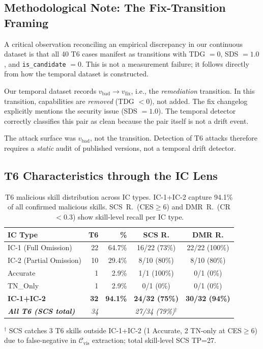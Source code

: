 \subsection{Methodological Note: The Fix-Transition Framing}

A critical observation reconciling an empirical discrepancy in our continuous dataset is that all 40 T6 cases manifest as transitions with TDG $= 0$, SDS $= 1.0$, and \texttt{is\_candidate} $= 0$. This is not a measurement failure; it follows directly from how the temporal dataset is constructed.

Our temporal dataset records $v_{\text{bad}} \to v_{\text{fix}}$,
i.e., the \emph{remediation} transition.
In this transition, capabilities are \emph{removed} (TDG $< 0$),
not added.
The fix changelog explicitly mentions the security issue (SDS $= 1.0$).
The temporal detector correctly classifies this pair as clean
because the pair itself is not a drift event.

The attack surface was $v_{\text{bad}}$, not the transition.
Detection of T6 attacks therefore requires a \emph{static} audit of
published versions, not a temporal drift detector.

\subsection{T6 Characteristics through the IC Lens}

\begin{table}[h]
\centering
\caption{T6 malicious skill distribution across IC types.
  IC-1+IC-2 capture 94.1\% of all confirmed malicious skills.
  SCS~R.~(CES$\geq$6) and DMR~R.~(CR$<$0.3) show skill-level recall per IC type.}
\label{tab:t6_ic_dist}
\scriptsize
\begin{tabular}{@{}lrrcc@{}}
\toprule
\textbf{IC Type} & \textbf{T6} & \textbf{\%} & \textbf{SCS R.} & \textbf{DMR R.} \\
\midrule
IC-1 (Full Omission)    & 22 & 64.7\% & 16/22 (73\%) & 22/22 (100\%) \\
IC-2 (Partial Omission) & 10 & 29.4\% &  8/10 (80\%) &  8/10 (80\%)  \\
Accurate                &  1 &  2.9\% &  1/1  (100\%)&  0/1  (0\%)   \\
TN\_Only                &  1 &  2.9\% &  0/1  (0\%)  &  0/1  (0\%)   \\
\midrule
\textbf{IC-1+IC-2}      & \textbf{32} & \textbf{94.1\%} & \textbf{24/32 (75\%)} & \textbf{30/32 (94\%)} \\
\textit{\textbf{All T6 (SCS total)}} & \textit{34} & & \textit{27/34 (79\%)}$^\dagger$ & \\
\bottomrule
\end{tabular}
\begin{minipage}{\columnwidth}
\vspace{2pt}\scriptsize
$^\dagger$ SCS catches 3 T6 skills outside IC-1+IC-2 (1 Accurate, 2 TN-only at CES$\geq$6)
due to false-negative in $\mathcal{C}_{\text{vis}}$ extraction; total skill-level SCS TP=27.
\end{minipage}
\end{table}

